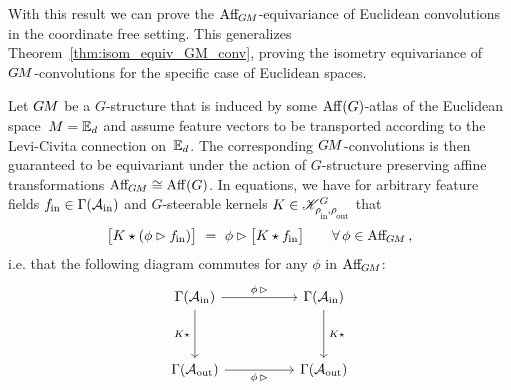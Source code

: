 With this result we can prove the $\operatorname{Aff}_{\mkern-2muG\mkern-1.4muM}$-equivariance of Euclidean convolutions in the coordinate free setting.
This generalizes Theorem~\ref{thm:isom_equiv_GM_conv}, proving the isometry equivariance of $G\mkern-1.4muM$-convolutions for the specific case of Euclidean spaces.
\begin{thm}
\label{thm:affine_equivariance_Euclidean_GM_conv}
    Let $G\mkern-1.4muM$ be a $G$-structure that is induced by some $\operatorname{Aff}(G)$-atlas of the Euclidean space~${M = \mathbb{E}_d}$ and assume feature vectors to be transported according to the Levi-Civita connection on~$\mathbb{E}_d$.
    The corresponding $G\mkern-1.4muM$-convolutions is then guaranteed to be equivariant under the action of $G$-structure preserving affine transformations $\operatorname{Aff}_{\mkern-2muG\mkern-1.4muM} \cong \operatorname{Aff}(G)$.
    In equations, we have for arbitrary feature fields $f_\textup{\;\!\!in} \in \Gamma(\mathcal{A}_\textup{in})$ and $G$-steerable kernels $K\in\KG$ that
    \begin{align}
        \big[K \star (\phi\rhd f_\textup{\;\!\!in}) \big]\ =\ \phi\rhd \big[K \star f_\textup{\;\!\!in} \big] \qquad \forall\, \phi\in\operatorname{Aff}_{\mkern-2muG\mkern-1.4muM} \,,
    \end{align}
    i.e. that the following diagram commutes for any $\phi$ in $\operatorname{Aff}_{\mkern-2muG\mkern-1.4muM}$:
    \begin{equation}\label{cd:}
    \begin{tikzcd}[row sep=3.5em, column sep=5.em]
        \Gamma(\Ain)
            \arrow[r, pos=.5, "\phi \,\rhd"]
            \arrow[d, "K\star\,"']
        & \Gamma(\Ain)
            \arrow[d, "\,K\star"]
        \\
        \Gamma(\Aout)
            \arrow[r, pos=.5, "\phi \,\rhd"']
        & \Gamma(\Aout)
    \end{tikzcd}
    \end{equation}
\end{thm}

